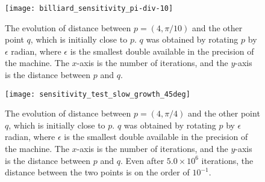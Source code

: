 \documentclass[10pt,twoside,draft]{book}
\begin{document}
\begin{figure}[ht]
  \begin{center}
    \texttt{[image: billiard\_sensitivity\_pi-div-10]}
    \caption{The evolution of distance between $p = (4, \pi/10)$ and the other point $q$, which is initially close to $p$.
      $q$ was obtained by rotating $p$ by $\epsilon$ radian, where $\epsilon$ is the smallest double available in the precision of the machine.
      The $x$-axis is the number of iterations, and the $y$-axis is the distance between $p$ and $q$.
    }
    \label{fig:sensitivity1}
  \end{center}
\end{figure}
\begin{figure}[ht]
  \begin{center}
    \texttt{[image: sensitivity\_test\_slow\_growth\_45deg]}
    \caption{The evolution of distance between $p = (4, \pi/4)$ and the other point $q$, which is initially close to $p$.
      $q$ was obtained by rotating $p$ by $\epsilon$ radian, where $\epsilon$ is the smallest double available in the precision of the machine.
      The $x$-axis is the number of iterations, and the $y$-axis is the distance between $p$ and $q$.
      Even after $5.0 \times 10^6$ iterations, the distance between the two points is on the order of $10^{-1}$.
    }
    \label{fig:sensitivity2}
  \end{center}
\end{figure}




\printindex
\end{document}

